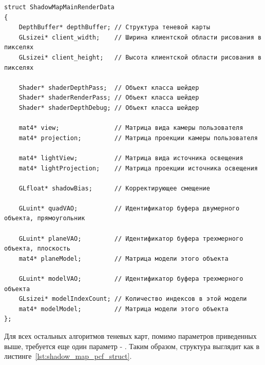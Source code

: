 \begin{center}
\captionsetup{justification=centering, singlelinecheck=off}
\begin{lstlisting}[label=lst:shadow_map_main_struct, caption={Структура параметров для стандартного алгоритма теневых карт}]
struct ShadowMapMainRenderData
{
    DepthBuffer* depthBuffer; // Структура теневой карты
    GLsizei* client_width;    // Ширина клиентской области рисования в пикселях
    GLsizei* client_height;   // Высота клиентской области рисования в пикселях

    Shader* shaderDepthPass;  // Объект класса шейдер
    Shader* shaderRenderPass; // Объект класса шейдер
    Shader* shaderDepthDebug; // Объект класса шейдер

    mat4* view;               // Матрица вида камеры пользователя
    mat4* projection;         // Матрица проекции камеры пользователя

    mat4* lightView;          // Матрица вида источника освещения
    mat4* lightProjection;    // Матрица проекции источника освещения

    GLfloat* shadowBias;      // Корректирующее смещение

    GLuint* quadVAO;          // Идентификатор буфера двумерного объекта, прямоугольник

    GLuint* planeVAO;         // Идентификатор буфера трехмерного объекта, плоскость
    mat4* planeModel;         // Матрица модели этого объекта

    GLuint* modelVAO;         // Идентификатор буфера трехмерного объекта
    GLsizei* modelIndexCount; // Количество индексов в этой модели
    mat4* modelModel;         // Матрица модели этого объекта
};
\end{lstlisting}
\end{center}

Для всех остальных алгоритмов теневых карт, помимо параметров
приведенных выше, требуется еще один параметр - .
Таким образом, структура выглядит как в
листинге~\ref{lst:shadow_map_pcf_struct}.

